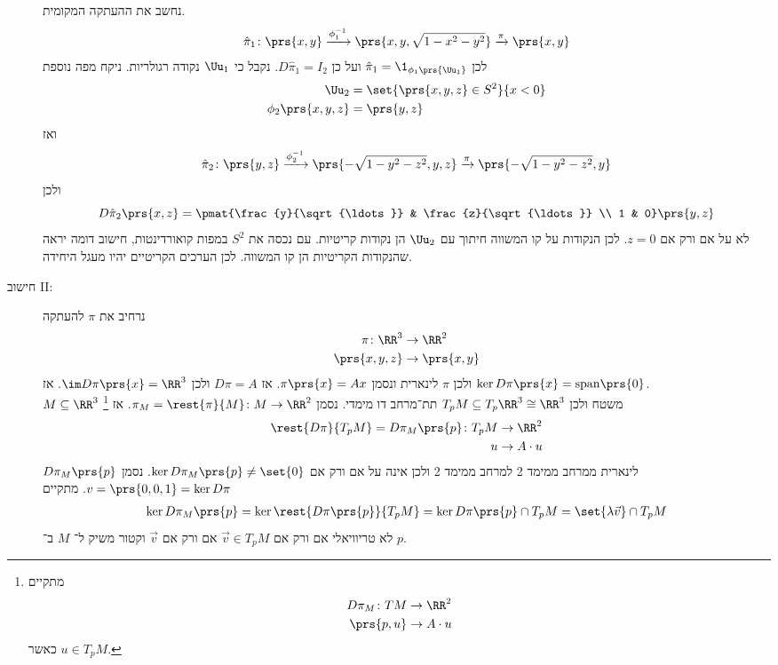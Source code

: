 \documentclass[a4paper,10pt,twoside,openany]{book}
\begin{document}
\begin{example}
\begin{description}
\begin{figure}[ht]
\caption{}
\label{project:shpere-plane-map}
\end{figure}
נחשב את ההעתקה המקומית.
\begin{align*}
\hat{\pi}_1 \colon \prs{x,y} \xrightarrow{\phi_1^{-1}} \prs{x,y,\sqrt{1-x^2-y^2}} \xrightarrow{\pi} \prs{x,y}
\end{align*}
לכן
$\hat{\pi}_1 = \1_{\phi_1\prs{\Uu_1}}$
ועל כן
$D\hat{\pi}_1 = I_2$.
נקבל כי
$\Uu_1$
נקודה רגולריות.
ניקח מפה נוספת
\begin{align*}
\Uu_2 &= \set{\prs{x,y,z}\in S^2}{x < 0} \\
\phi_2\prs{x,y,z} &= \prs{y,z}
\end{align*}
ואז
\[\hat{\pi}_2 \colon \prs{y,z} \xrightarrow{\phi_2^{-1}}\prs{-\sqrt{1-y^2-z^2},y,z} \xrightarrow{\pi} \prs{-\sqrt{1-y^2-z^2},y}\]
ולכן
\[D\hat{\pi}_2\prs{x,z} = \pmat{\frac{y}{\sqrt{\ldots}} & \frac{z}{\sqrt{\ldots}} \\ 1 & 0}\prs{y,z}\]
לא על אם ורק אם
$z=0$.
לכן הנקודות על קו המשווה חיתוך עם
$\Uu_2$
הן נקודות קריטיות.
עם נכסה את
$S^2$
במפות קואורדינטות, חישוב דומה יראה שהנקודות הקריטיות הן קו המשווה.
לכן הערכים הקריטיים יהיו מעגל היחידה.
\item[חישוב \textenglish{II}:]
נרחיב את
$\pi$
להעתקה
\begin{align*}
\pi \colon \RR^3 &\to \RR^2 \\
\prs{x,y,z} &\to \prs{x,y}
\end{align*}
ולכן
$\pi$
לינארית ונסמן
$\pi\prs{x} = Ax$.
אז
$D\pi = A$
ולכן
$\im D\pi\prs{x} = \RR^3$.
אז
$\ker D\pi\prs{x} = \mathrm{span}\prs{0}$.\\
$M \subseteq \RR^3$
משטח ולכן
$T_p M \subseteq T_p \RR^3 \cong \RR^3$
תת־מרחב דו מימדי.
נסמן
$\pi_M = \rest{\pi}{M} \colon M \to \RR^2$.
אז%
\footnote{מתקיים \begin{align*}
D\pi_M \colon TM &\to \RR^2 \\ \prs{p,u} &\to A\cdot u
\end{align*}
כאשר
$u \in T_pM$.}
\begin{align*}
\rest{D\pi}{T_p M} = D \pi_M\prs{p} \colon T_p M &\to \RR^2 \\
u &\to A\cdot u
\end{align*}
$D\pi_M\prs{p}$
לינארית ממרחב ממימד 2 למרחב ממימד 2 ולכן אינה על אם ורק אם
$\ker D\pi_M\prs{p} \neq \set{0}$.
נסמן
$v = \prs{0,0,1} = \ker D\pi$.
מתקיים
\begin{align*}
\ker D\pi_M\prs{p} = \ker \rest{D\pi\prs{p}}{T_pM} = \ker D\pi\prs{p} \cap T_p M = \set{\lambda \vec{v}}\cap T_p M
\end{align*}
לא טריוויאלי אם ורק אם
$\vec{v} \in T_p M$
אם ורק אם
$\vec{v}$
וקטור משיק ל־%
$M$
ב־%
$p$.
\end{description}
\end{example}
\end{document}

